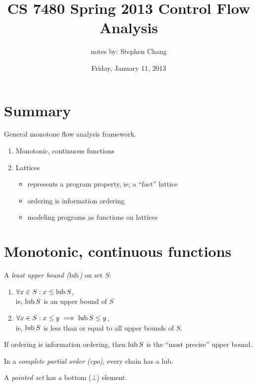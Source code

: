\documentclass{article}
\title{CS 7480 Spring 2013 Control Flow Analysis}
\author{notes by: Stephen Chang}
\date{Friday, January 11, 2013}
\begin{document}
\maketitle

\section{Summary}
General monotone flow analysis framework.
\begin{enumerate}
  \item Monotonic, continuous functions
  \item Lattices
    \begin{itemize}
      \item represents a program property, ie, a ``fact'' lattice
      \item ordering is information ordering
      \item modeling programs as functions on lattices
    \end{itemize}
\end{enumerate}

\section{Monotonic, continuous functions}
\begin{definition}
  A \emph{least upper bound ($\operatorname{lub}$)} on set $S$:%
  \begin{enumerate}
    \item $\forall x \in S: x \leq \operatorname{lub}{S}$, \\
      ie, $\operatorname{lub}{S}$ is an upper bound of $S$
    \item $\forall x \in S: x \leq y \implies \operatorname{lub}{S} \leq y$,\\
      ie, $\operatorname{lub}{S}$ is less than or equal to all upper bounds of $S$.
  \end{enumerate}
\end{definition}

\noindent If ordering is information ordering, then $\operatorname{lub}{S}$ is the ``most
precise'' upper bound.

\begin{definition}
  In a \emph{complete partial order (cpo)}, every chain has a lub.
\end{definition}

\begin{definition}
  A \emph{pointed set} has a bottom ($\bot$) element.
\end{definition}
\end{document}
